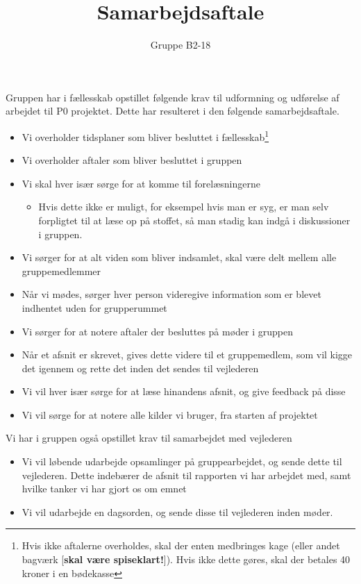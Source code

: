 	\title{Samarbejdsaftale}
	\author{Gruppe B2-18}
	\maketitle
	Gruppen har i fællesskab opstillet følgende krav til udformning og udførelse af arbejdet til P0 projektet. Dette har resulteret i den følgende samarbejdsaftale.
	
	\begin{itemize}
		\item Vi overholder tidsplaner som bliver besluttet i fællesskab\footnote{\label{note1}Hvis ikke aftalerne overholdes, skal der enten medbringes kage (eller andet bagværk [\textbf{skal være spiseklart!}]). Hvis ikke dette gøres, skal der betales 40 kroner i en bødekasse}
		\item Vi overholder aftaler som bliver besluttet i gruppen
		\item Vi skal hver især sørge for at komme til forelæsningerne
		\begin{itemize}
			\item Hvis dette ikke er muligt, for eksempel hvis man er syg, er man selv forpligtet til at læse op på stoffet, så man stadig kan indgå i diskussioner i gruppen. 
		\end{itemize}
		\item Vi sørger for at alt viden som bliver indsamlet, skal være delt mellem alle gruppemedlemmer
		\item Når vi mødes, sørger hver person videregive information som er blevet indhentet uden for grupperummet
		\item Vi sørger for at notere aftaler der besluttes på møder i gruppen
		\item Når et afsnit er skrevet, gives dette videre til et gruppemedlem, som vil kigge det igennem og rette det inden det sendes til vejlederen
		\item Vi vil hver især sørge for at læse hinandens afsnit, og give feedback på disse
		\item Vi vil sørge for at notere alle kilder vi bruger, fra starten af projektet
	\end{itemize}

	Vi har i gruppen også opstillet krav til samarbejdet med vejlederen

	\begin{itemize}
		\item Vi vil løbende udarbejde opsamlinger på gruppearbejdet, og sende dette til vejlederen. Dette indebærer de afsnit til rapporten vi har arbejdet med, samt hvilke tanker vi har gjort os om emnet
		\item Vi vil udarbejde en dagsorden, og sende disse til vejlederen inden møder.
	\end{itemize}

